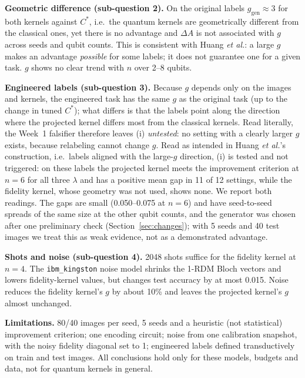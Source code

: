 \documentclass[conference]{IEEEtran}
\begin{document}
\textbf{Geometric difference (sub-question 2).} On the original labels $g_{\mathrm{gen}}\approx3$ for both kernels against $C^\ast$, i.e.\ the quantum kernels are geometrically different from the classical ones, yet there is no advantage and $\Delta A$ is not associated with $g$ across seeds and qubit counts. This is consistent with Huang \textit{et al.}: a large $g$ makes an advantage \emph{possible} for some labels; it does not guarantee one for a given task. $g$ shows no clear trend with $n$ over 2--8 qubits.

\textbf{Engineered labels (sub-question 3).} Because $g$ depends only on the images and kernels, the engineered task has the same $g$ as the original task (up to the change in tuned $C^\ast$); what differs is that the labels point along the direction where the projected kernel differs most from the classical kernels. Read literally, the Week~1 falsifier therefore leaves (i) \emph{untested}: no setting with a clearly larger $g$ exists, because relabeling cannot change $g$. Read as intended in Huang \textit{et al.}'s construction, i.e.\ labels aligned with the large-$g$ direction, (i) is tested and not triggered: on these labels the projected kernel meets the improvement criterion at $n=6$ for all three $\lambda$ and has a positive mean gap in 11 of 12 settings, while the fidelity kernel, whose geometry was not used, shows none. We report both readings. The gaps are small (0.050--0.075 at $n=6$) and have seed-to-seed spreads of the same size at the other qubit counts, and the generator was chosen after one preliminary check (Section~\ref{sec:changes}); with 5 seeds and 40 test images we treat this as weak evidence, not as a demonstrated advantage.

\textbf{Shots and noise (sub-question 4).} 2048 shots suffice for the fidelity kernel at $n=4$. The \texttt{ibm\_kingston} noise model shrinks the 1-RDM Bloch vectors and lowers fidelity-kernel values, but changes test accuracy by at most 0.015. Noise reduces the fidelity kernel's $g$ by about 10\% and leaves the projected kernel's $g$ almost unchanged.

\textbf{Limitations.} 80/40 images per seed, 5 seeds and a heuristic (not statistical) improvement criterion; one encoding circuit; noise from one calibration snapshot, with the noisy fidelity diagonal set to 1; engineered labels defined transductively on train and test images. All conclusions hold only for these models, budgets and data, not for quantum kernels in general.
\end{document}
